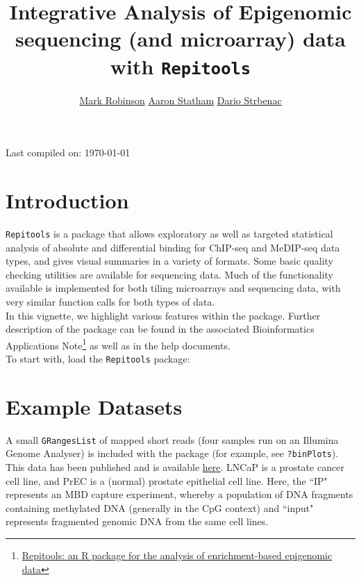 \documentclass[a4paper, 12pt]{article}
\author{\href{mailto:m.robinson@garvan.org.au}{Mark Robinson}  \href{mailto:a.statham@garvan.org.au}{Aaron Statham}  \href{mailto:d.strbenac@garvan.org.au}{Dario Strbenac}}
\begin{document}

\title{Integrative Analysis of Epigenomic sequencing (and microarray) data with \texttt{Repitools}}
\date{}
\maketitle
\begin{center}
    Last compiled on: \today
\end{center}

\section{Introduction}
\texttt{Repitools} is a package that allows exploratory as well as targeted statistical analysis of absolute and differential binding for ChIP-seq and MeDIP-seq data types, and gives visual summaries in a variety of formats. Some basic quality checking utilities are available for sequencing data. Much of the functionality available is implemented for both tiling microarrays and sequencing data, with very similar function calls for both types of data. \\

In this vignette, we highlight various features within the package.  Further description of the package can be found in the associated Bioinformatics Applications Note\footnote{\href{http://bioinformatics.oxfordjournals.org/content/26/13/1662.abstract}{Repitools: an R package for the analysis of enrichment-based epigenomic data}} as well as in the help documents. \\

To start with, load the \texttt{Repitools} package:



\section{Example Datasets}
A small \texttt{GRangesList} of mapped short reads (four samples run on an Illumina Genome Analyser) is included with the package (for example, see \texttt{?binPlots}). This data has been published and is available \href{http://www.ncbi.nlm.nih.gov/geo/query/acc.cgi?acc=GSE24546}{here}. LNCaP is a prostate cancer cell line, and PrEC is a (normal) prostate epithelial cell line.  Here, the ``IP" represents an MBD capture experiment, whereby a population of DNA fragments containing methylated DNA (generally in the CpG context) and ``input" represents fragmented genomic DNA from the same cell lines. \\
\end{document}
